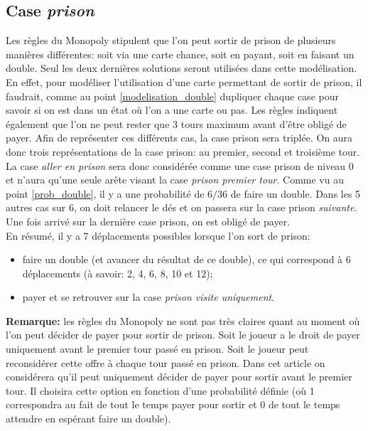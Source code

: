 \documentclass[letterpaper]{article}
\begin{document}
  \subsection{Case \textit{prison}}
    \label{case_prison}
    Les règles du Monopoly stipulent que l'on peut sortir de prison de
    plusieurs manières différentes: soit via une carte chance, soit en
    payant, soit en faisant un double. Seul les deux dernières solutions
    seront utilisées dans cette modélisation. En effet, pour modéliser
    l'utilisation d'une carte permettant de sortir de prison, il faudrait,
    comme au point \ref{modelisation_double} dupliquer chaque case
    pour savoir si on est dans un état où l'on a une carte ou pas.
    Les règles indiquent également que l'on ne peut rester que 3 tours
    maximum avant d'être obligé de payer. Afin de représenter ces
    différents cas, la case prison sera triplée. On aura donc trois
    représentations de la case prison: au premier, second et troisième
    tour. La case \textit{aller en prison} sera donc considérée comme
    une case prison de niveau 0 et n'aura qu'une seule arête visant la
    case \textit{prison premier tour}. Comme vu au point \ref{prob_double},
    il y a une probabilité de $6/36$ de faire un double.  Dans les 5
    autres cas sur 6, on doit relancer le dés et on passera sur la case
    prison \textit{suivante}. Une fois arrivé sur la dernière case
    prison, on est obligé de payer.\\
    En résumé, il y a 7 déplacements possibles lorsque l'on sort de
    prison:
    \begin{itemize}
      \item faire un double (et avancer du résultat de ce double),
	ce qui correspond à 6 déplacements (à savoir: 2, 4, 6, 8, 10 et 12);
      \item payer et se retrouver sur la case \textit{prison visite
	uniquement}.
    \end{itemize}
    \textbf{Remarque:} les règles du Monopoly ne sont pas très claires
    quant au moment où l'on peut décider de payer pour sortir de prison.
    Soit le joueur a le droit de payer uniquement avant le premier tour
    passé en prison.  Soit le joueur peut reconsidérer cette offre à
    chaque tour passé en prison.  Dans cet article on considérera qu'il
    peut uniquement décider de payer pour sortir avant le premier tour.
    Il choisira cette option en fonction d'une probabilité définie (où
    1 correspondra au fait de tout le temps payer pour sortir et 0 de
    tout le temps attendre en espérant faire un double).
\end{document}
